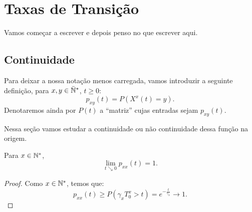 \chapter{Taxas de Transição}
\label{cap:taxas}

Vamos começar a escrever e depois penso no que escrever aqui.


\section{Continuidade}
\label{sec:continuidade}

Para deixar a nossa notação menos carregada, vamos introduzir a
seguinte definição, para $x, y \in {\mathbb{\bar{N}^*}}$, $t \geq 0$:
\begin{equation}
  p_{xy} (t) = P(X^x(t) = y).
\end{equation}
Denotaremos ainda por $P(t)$ a ``matriz'' cujas entradas sejam $p_{xy}(t)$.

Nessa seção vamos estudar a continuidade ou não continuidade dessa
função na origem.

\begin{proposicao}
  Para $x \in {\mathbb{N^*}}$,
  \begin{equation}
    \lim_{t \searrow 0}p_{xx}(t) = 1.   
  \end{equation}
\end{proposicao}
\begin{proof}
  Como $x \in {\mathbb{N^*}}$, temos que:
  \begin{displaymath}
    p_{xx}(t) \geq P( \gamma_x T^x_0 > t) = e^{-\frac{t}{\gamma_x}}
    \to 1.
  \end{displaymath}
\end{proof}

